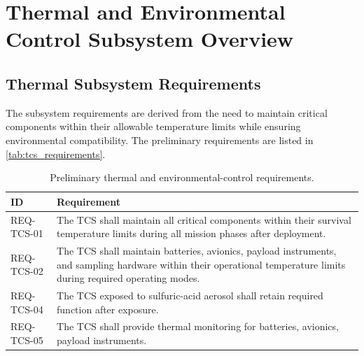 


\section{Thermal and Environmental Control Subsystem Overview}

\subsection{Thermal Subsystem Requirements}
\label{sec:tcs_requirements}
The subsystem requirements are derived from the need to maintain critical components within their
allowable temperature limits while ensuring environmental compatibility. The preliminary
requirements are listed in \autoref{tab:tcs_requirements}.
\begin{table}[H]
\centering
\renewcommand{\arraystretch}{1}
\small
\caption{Preliminary thermal and environmental-control requirements.}
\label{tab:tcs_requirements}
\begin{tabular}{|p{2.5cm}|p{10.5cm}|}
\hline
\textbf{ID} & \textbf{Requirement} \\
\hline
REQ-TCS-01 & The TCS shall maintain all critical components within their survival temperature limits during all mission phases after deployment. \\ \hline
REQ-TCS-02 & The TCS shall maintain batteries, avionics, payload instruments, and sampling hardware within their operational temperature limits during required operating modes. \\ \hline
REQ-TCS-04 & The TCS exposed to sulfuric-acid aerosol shall retain required function after exposure. \\ \hline
REQ-TCS-05 & The TCS shall provide thermal monitoring for batteries, avionics, payload instruments. \\
\hline
\end{tabular}
\end{table}


